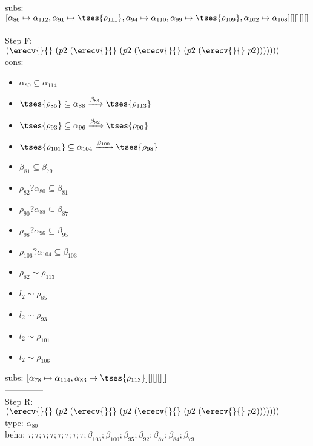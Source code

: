 \documentclass[12pt]{article}
\begin{document}
  subs:  $ [ \alpha_{86}\mapsto\alpha_{112}, \alpha_{91}\mapsto \tses{ \rho_{111}}, \alpha_{94}\mapsto\alpha_{110}, \alpha_{99}\mapsto \tses{ \rho_{109}}, \alpha_{102}\mapsto\alpha_{108}] [] [] [] [] $  
 \\--------------\\ 
Step F: $ (\erecv{}{}~(p2~(\erecv{}{}~(p2~(\erecv{}{}~(p2~(\erecv{}{}~p2))))))) $
 \\ cons: \begin{itemize}
\item $ \alpha_{80} \subseteq \alpha_{114} $
\item $  \tses{ \rho_{85}} \subseteq \alpha_{88} \xrightarrow{\beta_{84}}  \tses{ \rho_{113}} $
\item $  \tses{ \rho_{93}} \subseteq \alpha_{96} \xrightarrow{\beta_{92}}  \tses{ \rho_{90}} $
\item $  \tses{ \rho_{101}} \subseteq \alpha_{104} \xrightarrow{\beta_{100}}  \tses{ \rho_{98}} $
\item $ \beta_{81} \subseteq \beta_{79} $
\item $ \rho_{82}?\alpha_{80} \subseteq \beta_{81} $
\item $ \rho_{90}?\alpha_{88} \subseteq \beta_{87} $
\item $ \rho_{98}?\alpha_{96} \subseteq \beta_{95} $
\item $ \rho_{106}?\alpha_{104} \subseteq \beta_{103} $
\item $ \rho_{82} \sim\rho_{113} $
\item $ l_{2} \sim\rho_{85} $
\item $ l_{2} \sim\rho_{93} $
\item $ l_{2} \sim\rho_{101} $
\item $ l_{2} \sim\rho_{106} $
\end{itemize}
 subs:  $ [ \alpha_{78}\mapsto\alpha_{114}, \alpha_{83}\mapsto \tses{ \rho_{113}}] [] [] [] [] $ 
  \\--------------\\ 
Step R: $ (\erecv{}{}~(p2~(\erecv{}{}~(p2~(\erecv{}{}~(p2~(\erecv{}{}~p2))))))) $\\
  type: $ \alpha_{80} $ 
\\  beha: $ \tau; \tau; \tau; \tau; \tau; \tau; \tau; \tau; \beta_{103}; \beta_{100}; \beta_{95}; \beta_{92}; \beta_{87}; \beta_{84}; \beta_{79} $ 
\end{document}
